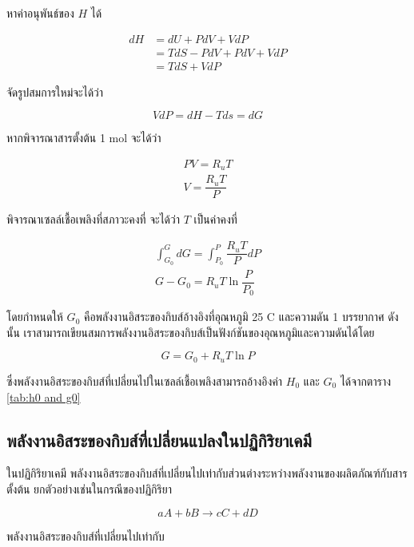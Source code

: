 \message{ !name(solar.tex)}\documentclass[
a4paper,
svgnames,
openany,
justified,
]{tufte-book}
\begin{document}
หาค่าอนุพันธ์ของ $H$ ได้

\begin{align}
  dH &= dU + PdV + VdP \nonumber \\
     &= TdS - PdV + PdV + VdP \nonumber \\
     &= TdS + VdP
\end{align}

จัดรูปสมการใหม่จะได้ว่า

\begin{equation}
  VdP = dH - Tds = dG
\end{equation} 

หากพิจารณาสารตั้งต้น 1 mol จะได้ว่า

\begin{gather*}
  \label{eq:ideal gas equation}
  PV = R_u T \\
  V = \dfrac{R_u T}{P}
\end{gather*}

พิจารณาเซลล์เชื้อเพลิงที่สภาวะคงที่ จะได้ว่า $T$ เป็นค่าคงที่

\begin{gather}
  \label{eq:gfe integral equation}
  \int_{G_0}^G dG = \int_{P_0}^P \dfrac{R_uT}{P}dP \\
  G - G_0 = R_u T \ln \dfrac{P}{P_0}
\end{gather}

โดยกำหนดให้ $G_0$ คือพลังงานอิสระของกิบส์อ้างอิงที่อุณหภูมิ 25 C และความดัน 1 บรรยากาศ ดังนั้น เราสามารถเขียนสมการพลังงานอิสระของกิบส์เป็นฟังก์ชันของอุณหภูมิและความดันได้โดย

\begin{equation}
  \label{eq:gfe ideal gas}
  G = G_0 + R_u T \ln P
\end{equation}

ซึ่งพลังงานอิสระของกิบส์ที่เปลี่ยนไปในเซลล์เชื้อเพลิงสามารถอ้างอิงค่า $H_0$ และ $G_0$ ได้จากตาราง \ref{tab:h0 and g0} 

\subsection{พลังงานอิสระของกิบส์ที่เปลี่ยนแปลงในปฏิกิริยาเคมี}

ในปฏิกิริยาเคมี พลังงานอิสระของกิบส์ที่เปลี่ยนไปเท่ากับส่วนต่างระหว่างพลังงานของผลิตภัณฑ์กับสารตั้งต้น ยกตัวอย่างเช่นในกรณีของปฏิกิริยา

\begin{equation*}
  aA + bB \rightarrow cC + dD
\end{equation*}

พลังงานอิสระของกิบส์ที่เปลี่ยนไปเท่ากับ
\end{document}
